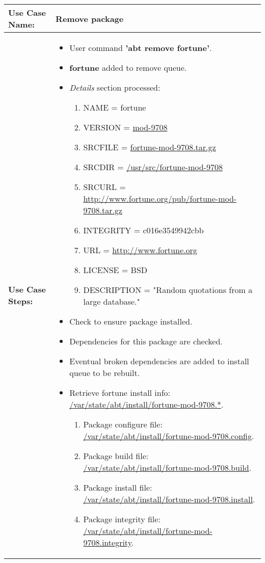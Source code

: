 \medskip

\begin{tabularx}{\linewidth}{|l|X|}
\hline
\textbf{Use Case Name:} & \textbf{Remove package} \\
\hline
\textbf{Use Case Steps:} & 
\begin{minipage}{\linewidth} 
  \vspace{0.05em}
  \begin{itemize}
    \item User command \textbf{'abt remove fortune'}.
    \item \textbf{fortune} added to remove queue.
    \item \emph{Details} section processed:
    \begin{enumerate}
      \item NAME = fortune
      \item VERSION = \url{mod-9708}
      \item SRCFILE = \url{fortune-mod-9708.tar.gz}
      \item SRCDIR = \url{/usr/src/fortune-mod-9708}
      \item SRCURL = \url{http://www.fortune.org/pub/fortune-mod-9708.tar.gz}
      \item INTEGRITY = c016e3549942cbb
      \item URL = \url{http://www.fortune.org}
      \item LICENSE = BSD
      \item DESCRIPTION = "Random quotations from a large database."
    \end{enumerate}
    \item Check to ensure package installed.
    \item Dependencies for this package are checked.
    \item Eventual broken dependencies are added to install queue to be rebuilt.
    \item Retrieve fortune install info: \url{/var/state/abt/install/fortune-mod-9708.*}.
    \begin{enumerate}
      \item Package configure file: \url{/var/state/abt/install/fortune-mod-9708.config}.
      \item Package build file: \url{/var/state/abt/install/fortune-mod-9708.build}.
      \item Package install file: \url{/var/state/abt/install/fortune-mod-9708.install}.
      \item Package integrity file: \url{/var/state/abt/install/fortune-mod-9708.integrity}.

\end{enumerate}
\end{itemize}
\end{minipage}
\end{tabularx}
